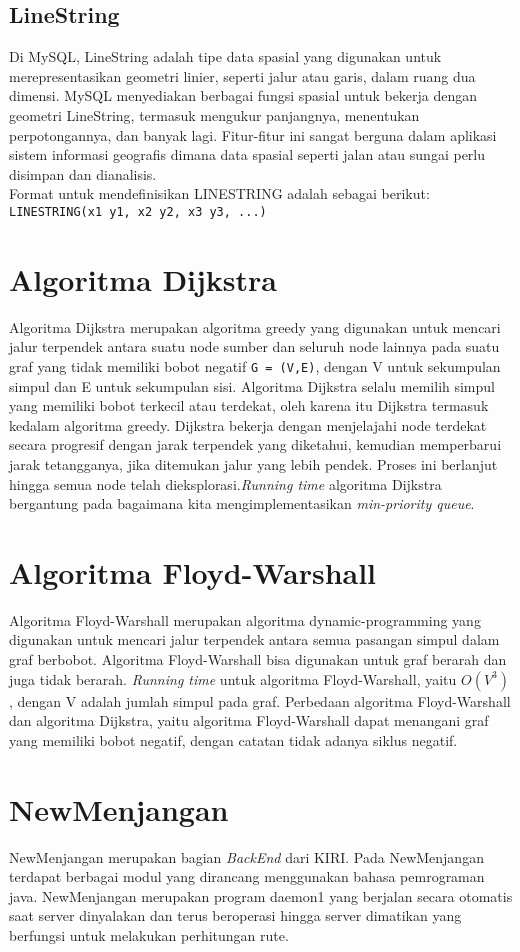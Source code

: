 \subsection{LineString}
\label{subs:linestring}
Di MySQL, LineString adalah tipe data spasial yang digunakan untuk merepresentasikan geometri linier, seperti jalur atau garis, dalam ruang dua dimensi. MySQL menyediakan berbagai fungsi spasial untuk bekerja dengan geometri LineString, termasuk mengukur panjangnya, menentukan perpotongannya, dan banyak lagi. Fitur-fitur ini sangat berguna dalam aplikasi sistem informasi geografis dimana data spasial seperti jalan atau sungai perlu disimpan dan dianalisis. \\
Format untuk mendefinisikan LINESTRING adalah sebagai berikut: \\
\texttt{LINESTRING(x1 y1, x2 y2, x3 y3, ...)}

\newpage

\section{Algoritma Dijkstra}
\label{sec:dijkstra}
Algoritma Dijkstra merupakan algoritma greedy yang digunakan untuk mencari jalur terpendek antara suatu node sumber dan seluruh node lainnya pada suatu graf yang tidak memiliki bobot negatif \texttt{G = (V,E)}, dengan V untuk sekumpulan simpul dan E untuk sekumpulan sisi. Algoritma Dijkstra selalu memilih simpul yang memiliki bobot terkecil atau terdekat, oleh karena itu Dijkstra termasuk kedalam algoritma greedy. Dijkstra bekerja dengan menjelajahi node terdekat secara progresif dengan jarak terpendek yang diketahui, kemudian memperbarui jarak tetangganya, jika ditemukan jalur yang lebih pendek. Proses ini berlanjut hingga semua node telah dieksplorasi.\textit{Running time} algoritma Dijkstra bergantung pada bagaimana kita mengimplementasikan \textit{min-priority queue}.

\section{Algoritma Floyd-Warshall}
\label{floydwarshall}
Algoritma Floyd-Warshall merupakan algoritma dynamic-programming yang digunakan untuk mencari jalur terpendek antara semua pasangan simpul dalam graf berbobot. Algoritma Floyd-Warshall bisa digunakan untuk graf berarah dan juga tidak berarah. \textit{Running time} untuk algoritma Floyd-Warshall, yaitu $O(V^3)$, dengan V adalah jumlah simpul pada graf. Perbedaan algoritma Floyd-Warshall dan algoritma Dijkstra, yaitu algoritma Floyd-Warshall dapat menangani graf yang memiliki bobot negatif, dengan catatan tidak adanya siklus negatif.



\section{NewMenjangan}
\label{sec:newmenjangan} 
NewMenjangan merupakan bagian \textit{BackEnd} dari KIRI. Pada NewMenjangan terdapat berbagai modul yang dirancang menggunakan bahasa pemrograman java. NewMenjangan merupakan program daemon1 yang berjalan secara otomatis saat server dinyalakan dan terus beroperasi hingga server dimatikan yang berfungsi untuk melakukan perhitungan rute.
